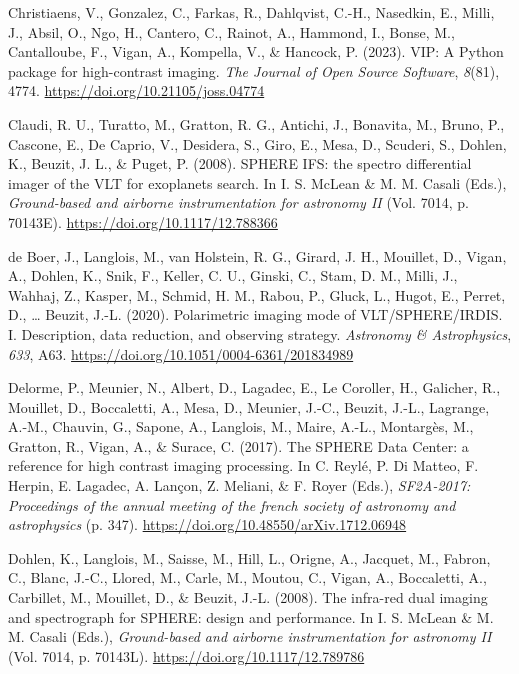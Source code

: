 \documentclass[
]{article}
\newlength{\cslhangindent}
\newenvironment{CSLReferences}[2] %
 {\begin{list}{}{%
  \setlength{\itemindent}{0pt}
  \setlength{\leftmargin}{0pt}
  \setlength{\parsep}{0pt}
  \ifodd #1
   \setlength{\leftmargin}{\cslhangindent}
   \setlength{\itemindent}{-1\cslhangindent}
  \fi
  \setlength{\itemsep}{#2\baselineskip}}}
 {\end{list}}
\begin{document}
\begin{CSLReferences}{1}{0}
Christiaens, V., Gonzalez, C., Farkas, R., Dahlqvist, C.-H., Nasedkin,
E., Milli, J., Absil, O., Ngo, H., Cantero, C., Rainot, A., Hammond, I.,
Bonse, M., Cantalloube, F., Vigan, A., Kompella, V., \& Hancock, P.
(2023). {VIP: A Python package for high-contrast imaging}. \emph{The
Journal of Open Source Software}, \emph{8}(81), 4774.
\url{https://doi.org/10.21105/joss.04774}

Claudi, R. U., Turatto, M., Gratton, R. G., Antichi, J., Bonavita, M.,
Bruno, P., Cascone, E., De Caprio, V., Desidera, S., Giro, E., Mesa, D.,
Scuderi, S., Dohlen, K., Beuzit, J. L., \& Puget, P. (2008). {SPHERE
IFS: the spectro differential imager of the VLT for exoplanets search}.
In I. S. McLean \& M. M. Casali (Eds.), \emph{Ground-based and airborne
instrumentation for astronomy II} (Vol. 7014, p. 70143E).
\url{https://doi.org/10.1117/12.788366}

de Boer, J., Langlois, M., van Holstein, R. G., Girard, J. H., Mouillet,
D., Vigan, A., Dohlen, K., Snik, F., Keller, C. U., Ginski, C., Stam, D.
M., Milli, J., Wahhaj, Z., Kasper, M., Schmid, H. M., Rabou, P., Gluck,
L., Hugot, E., Perret, D., \ldots{} Beuzit, J.-L. (2020). {Polarimetric
imaging mode of VLT/SPHERE/IRDIS. I. Description, data reduction, and
observing strategy}. \emph{Astronomy \& Astrophysics}, \emph{633}, A63.
\url{https://doi.org/10.1051/0004-6361/201834989}

Delorme, P., Meunier, N., Albert, D., Lagadec, E., Le Coroller, H.,
Galicher, R., Mouillet, D., Boccaletti, A., Mesa, D., Meunier, J.-C.,
Beuzit, J.-L., Lagrange, A.-M., Chauvin, G., Sapone, A., Langlois, M.,
Maire, A.-L., Montargès, M., Gratton, R., Vigan, A., \& Surace, C.
(2017). {The SPHERE Data Center: a reference for high contrast imaging
processing}. In C. Reylé, P. Di Matteo, F. Herpin, E. Lagadec, A.
Lançon, Z. Meliani, \& F. Royer (Eds.), \emph{SF2A-2017: Proceedings of
the annual meeting of the french society of astronomy and astrophysics}
(p. 347). \url{https://doi.org/10.48550/arXiv.1712.06948}

Dohlen, K., Langlois, M., Saisse, M., Hill, L., Origne, A., Jacquet, M.,
Fabron, C., Blanc, J.-C., Llored, M., Carle, M., Moutou, C., Vigan, A.,
Boccaletti, A., Carbillet, M., Mouillet, D., \& Beuzit, J.-L. (2008).
{The infra-red dual imaging and spectrograph for SPHERE: design and
performance}. In I. S. McLean \& M. M. Casali (Eds.), \emph{Ground-based
and airborne instrumentation for astronomy II} (Vol. 7014, p. 70143L).
\url{https://doi.org/10.1117/12.789786}


\end{CSLReferences}
\end{document}
